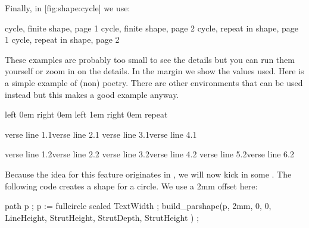 Finally, in  [fig:shape:cycle] we use:

\startbuffer[demo]
\startshapedparagraph[list=test,method=cycle]
\stopshapedparagraph
\stopbuffer

\startshapedparagraph[list=test-repeat,method=cycle]
\stopshapedparagraph
\stopbuffer


\startplacefigure[title=Cycled shaping,reference=fig:shape:cycle]
              {cycle, finite shape,    page 1}
    {}              {cycle, finite shape,    page 2}
    {} {cycle, repeat in shape, page 1}
    {} {cycle, repeat in shape, page 2}
\stopcombination
\stopplacefigure

These examples are probably too small to see the details but you can run them
yourself or zoom in on the details. In the margin we show the values used. Here
is a simple example of (non) poetry. There are other environments that can be
used instead but this makes a good example anyway.

\startbuffer
\startparagraphshape[test]
    left 0em right 0em
    left 1em right 0em
    repeat
\stopparagraphshape

\startshapedparagraph[list=test,method=cycle]
    verse line 1.1\crlf verse line 2.1\crlf
    verse line 3.1\crlf verse line 4.1\par
    verse line 1.2\crlf verse line 2.2\crlf
    verse line 3.2\crlf verse line 4.2\crlf
    verse line 5.2\crlf verse line 6.2\par
\stopshapedparagraph
\stopbuffer

\typebuffer[option=TEX]

\start \getbuffer \stop

Because the idea for this feature originates in \METAFUN, we will now kick in
some \METAPOST. The following code creates a shape for a circle. We use a
2mm offset here:

\startbuffer
{}
    path p ; p := fullcircle scaled TextWidth ;
    build_parshape(p,
        2mm, 0, 0,
        LineHeight, StrutHeight, StrutDepth, StrutHeight
    ) ;
\stopuseMPgraphic
\stopbuffer

